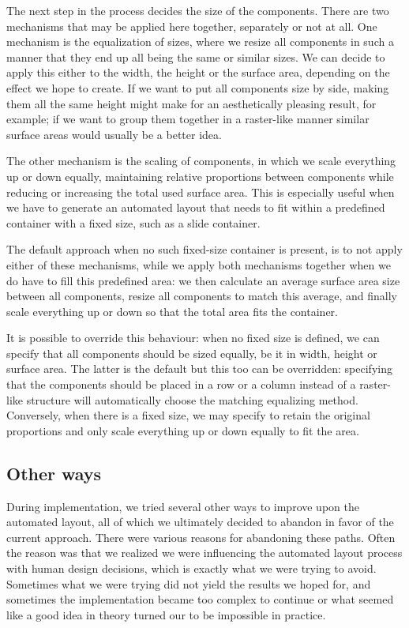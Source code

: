     The next step in the process decides the size of the components. There are
    two mechanisms that may be applied here together, separately or not at all.
    One mechanism is the equalization of sizes, where we resize all components
    in such a manner that they end up all being the same or similar sizes. We
    can decide to apply this either to the width, the height or the surface
    area, depending on the effect we hope to create. If we want to put all
    components size by side, making them all the same height might make for an
    aesthetically pleasing result, for example; if we want to group them
    together in a raster-like manner similar surface areas would usually be a
    better idea.

    The other mechanism is the scaling of components, in which we scale
    everything up or down equally, maintaining relative proportions between
    components while reducing or increasing the total used surface area. This
    is especially useful when we have to generate an automated layout that
    needs to fit within a predefined container with a fixed size, such as a
    slide container.

    The default approach when no such fixed-size container is present, is to
    not apply either of these mechanisms, while we apply both mechanisms
    together when we do have to fill this predefined area: we then calculate an
    average surface area size between all components, resize all components to
    match this average, and finally scale everything up or down so that the
    total area fits the container.

    It is possible to override this behaviour: when no fixed size is defined,
    we can specify that all components should be sized equally, be it in width,
    height or surface area. The latter is the default but this too can be
    overridden: specifying that the components should be placed in a row or a
    column instead of a raster-like structure will automatically choose the
    matching equalizing method. Conversely, when there is a fixed size, we may
    specify to retain the original proportions and only scale everything up or
    down equally to fit the area.
   
   \subsection{Other ways}

    During implementation, we tried several other ways to improve upon the
    automated layout, all of which we ultimately decided to abandon in favor of
    the current approach. There were various reasons for abandoning these
    paths. Often the reason was that we realized we were influencing the
    automated layout process with human design decisions, which is exactly what
    we were trying to avoid. Sometimes what we were trying did not yield the
    results we hoped for, and sometimes the implementation became too complex
    to continue or what seemed like a good idea in theory turned our to be
    impossible in practice.

